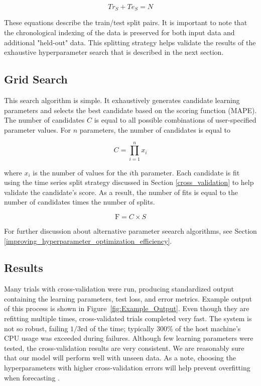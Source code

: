\documentclass[11pt, oneside, authoryear]{report}
\begin{document}
\begin{equation}
  \label{eq:6}
  Tr_{S} + Te_{S} = N
\end{equation}

These equations describe the train/test split pairs. It is important to note that the chronological indexing of the data is preserved for both input data and additional "held-out" data. This splitting strategy helps validate the results of the exhaustive hyperparameter search that is described in the next section.
\subsection{Grid Search}
This search algorithm is simple. It exhaustively generates candidate learning parameters and selects the best candidate based on the scoring function (MAPE). The number of candidates $C$ is equal to all possible combinations of user-specified parameter values. For $n$ parameters, the number of candidates is equal to

\begin{equation}
  C = \prod_{i=1}^{n} x_i
\end{equation}

\noindent where $x_i$ is the number of values for the $i$th parameter. Each candidate is fit using the time series split strategy discussed in Section \ref{cross_validation} to help validate the candidate's score. As a result, the number of fits is equal to the number of candidates times the number of splits.

\begin{equation}
  \text{F} = C \times S
\end{equation}

\noindent For further discussion about alternative parameter seearch algorithms, see Section \ref{improving_hyperparameter_optimization_efficiency}.

\subsection{Results}
Many trials with cross-validation were run, producing standardized output containing the learning parameters, test loss, and error metrics. Example output of this process is shown in Figure~\ref{fig:Example_Output}. Even though they are refitting multiple times, cross-validated trials completed very fast. The system is not so robust, failing $1/3$rd of the time; typically 300\% of the host machine's CPU usage was exceeded during failures. Although few learning parameters were tested, the cross-validation results are very consistent. We are reasonably sure that our model will perform well with unseen data. As a note, choosing the hyperparameters with higher cross-validation errors will help prevent overfitting when forecasting \citep{ng}.
\end{document}
